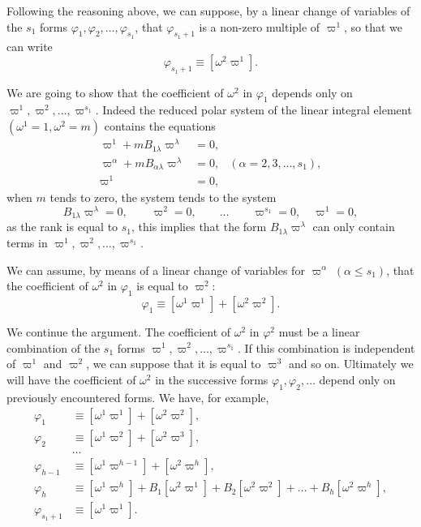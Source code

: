 \documentclass[leqno,11pt]{book}
\numberwithin{equation}{chapter}
\theoremstyle{shape1}
\theoremstyle{shape0}
\theoremstyle{shape2}
\theoremstyle{definition}
\begin{document}
\vspace{12pt}\fsec Following the reasoning above, we can suppose, by a linear change of variables of the $s_{1}$ forms $\varphi_{1},\varphi_{2},\dots,\varphi_{s_{1}}$, that $\varphi_{s_{1}+1}$ is a non-zero multiple of $\varpi^{1}$, so that we can write
\begin{equation}
  \label{eq:6.8}
  \varphi_{s_{1}+1}\equiv[\omega^{2}\varpi^{1}].
\end{equation}

We are going to show that the coefficient of $\omega^{2}$ in $\varphi_{1}$ depends only on $\varpi^{1},\varpi^{2},\dots,\varpi^{s_{1}}$. Indeed the reduced polar system of the linear integral element $(\omega^{1}=1,\omega^{2}=m)$ contains the equations
\begin{align*}
  \varpi^{1}+mB_{1\lambda}\varpi^{\lambda}&=0,\\
  \varpi^{\alpha}+mB_{\alpha\lambda}\varpi^{\lambda}&=0,&(\alpha=2,3,\dots,s_{1}),\\
  \varpi^{1}&=0,
\end{align*}
when $m$ tends to zero, the system tends to the system
\[
B_{1\lambda}\varpi^{\lambda}=0,\qquad\varpi^{2}=0,\qquad\dots\qquad\varpi^{s_{1}}=0,\quad\varpi^{1}=0,
\]
as the rank is equal to $s_{1}$, this implies that the form $B_{1\lambda}\varpi^{\lambda}$ can only contain terms in $\varpi^{1},\varpi^{2},\dots,\varpi^{s_{1}}$.

We can assume, by means of a linear change of variables for $\varpi^{\alpha}$ $(\alpha\le s_{1})$, that the coefficient of $\omega^{2}$ in $\varphi_{1}$ is equal to $\varpi^{2}$:
\[
\varphi_{1}\equiv[\omega^{1}\varpi^{1}]+[\omega^{2}\varpi^{2}].
\]

We continue the argument. The coefficient of $\omega^{2}$ in $\varphi^{2}$ must be a linear combination of the $s_{1}$ forms $\varpi^{1},\varpi^{2},\dots,\varpi^{s_{1}}$. If this combination is independent of $\varpi^{1}$ and $\varpi^{2}$, we can suppose that it is equal to $\varpi^{3}$ and so on. Ultimately we will have the coefficient of $\omega^{2}$ in the successive forms $\varphi_{1},\varphi_{2},\dots$ depend only on previously encountered forms. We have, for example,
\begin{align*}
  \varphi_{1}&\equiv[\omega^{1}\varpi^{1}]+[\omega^{2}\varpi^{2}],\\
  \varphi_{2}&\equiv[\omega^{1}\varpi^{2}]+[\omega^{2}\varpi^{3}],\\
  &\dots\\
  \varphi_{h-1}&\equiv[\omega^{1}\varpi^{h-1}]+[\omega^{2}\varpi^{h}],\\
  \varphi_{h}&\equiv[\omega^{1}\varpi^{h}]+B_{1}[\omega^{2}\varpi^{1}]+B_{2}[\omega^{2}\varpi^{2}]+\dots+B_{h}[\omega^{2}\varpi^{h}],\\
  \varphi_{s_{1}+1}&\equiv[\omega^{1}\varpi^{1}].
\end{align*}
\end{document}

